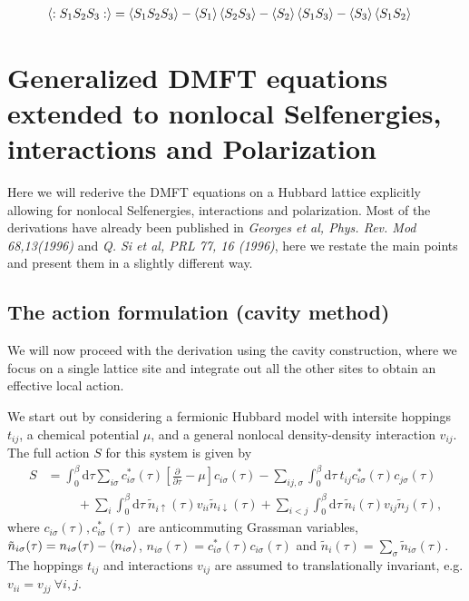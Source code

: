 \documentclass[12pt,a4paper]{scrartcl}
\numberwithin{equation}{section}
\begin{document}
\begin{align}
 \braket{:S_1S_2S_3:}
 &=\braket{S_1S_2S_3} -  \braket{S_1}\braket{S_2 S_3}  -\braket{S_2}\braket{S_1 S_3} - \braket{S_3}\braket{S_1 S_2} 
\end{align}



\clearpage



\section{Generalized DMFT equations extended to nonlocal Selfenergies, interactions and Polarization}

Here we will rederive the DMFT equations on a Hubbard lattice explicitly allowing
for nonlocal Selfenergies, interactions and polarization. Most of the derivations
have already been published in \textit{Georges et al, Phys. Rev. Mod 68,13(1996)} and 
\textit{Q. Si et al, PRL 77, 16 (1996)}, here we restate the main points and present them in
a slightly different way. 

\subsection{The action formulation (cavity method)}
We will now proceed with the derivation using the cavity construction, where
we focus on a single lattice site and integrate out all the other sites
to obtain an effective local action.

We start out by considering a fermionic Hubbard model with intersite hoppings $t_{ij}$,
a chemical potential $\mu$, and a general nonlocal density-density interaction $v_{ij}$.
The full action $S$ for this system is given by
\begin{align}
S 
&= \int_0^{\beta} \mathrm{d}\tau \sum_{i\sigma} c^*_{i\sigma}(\tau)\left[ \frac{\partial}{\partial \tau} - \mu \right] c_{i\sigma}(\tau) 
    -\sum_{ij,\sigma} \int_0^{\beta} \mathrm{d}\tau \ t_{ij} c^*_{i\sigma}(\tau)  c_{j\sigma}(\tau)  \nonumber \\
&\hspace{1cm} + \sum_{i} \int_0^{\beta} \mathrm{d}\tau \ \tilde{n}_{i\uparrow}(\tau) v_{ii} \tilde{n}_{i\downarrow}(\tau)
+ \sum_{i<j} \int_0^{\beta} \mathrm{d}\tau \ \tilde{n}_{i}(\tau) v_{ij} \tilde{n}_{j}(\tau),
\end{align}
where $c_{i\sigma}(\tau),c^*_{i\sigma}(\tau)$ are anticommuting Grassman variables, 
$\tilde{n}_{i\sigma}(\tau) = n_{i\sigma}(\tau) - \braket{n_{i\sigma}}$,
$n_{i\sigma}(\tau) = c^*_{i\sigma}(\tau)c_{i\sigma}(\tau)$ and $\tilde{n}_{i}(\tau) = \sum_{\sigma} \tilde{n}_{i\sigma}(\tau)$.
The hoppings $t_{ij}$ and interactions $v_{ij}$ are assumed to translationally invariant, e.g. $v_{ii}=v_{jj} \ \forall i,j$.
\end{document}
